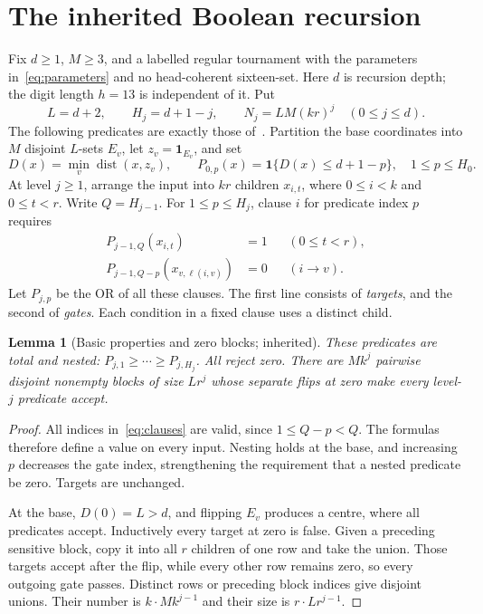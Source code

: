 \documentclass[11pt]{amsart}
\newtheorem{lemma}[theorem]{Lemma}
\theoremstyle{definition}
\theoremstyle{remark}
\newcommand{\dist}{\operatorname{dist}}
\newcommand{\ind}{\mathbf1}
\begin{document}
\section{The inherited Boolean recursion}
Fix $d\ge1$, $M\ge3$, and a labelled regular tournament with the parameters
in~\eqref{eq:parameters} and no head-coherent sixteen-set.
Here $d$ is recursion depth; the digit length $h=13$ is independent of it.
Put
\begin{equation}\label{eq:heights}
 L=d+2,\qquad H_j=d+1-j,\qquad N_j=LM(kr)^j
 \quad(0\le j\le d).
\end{equation}
The following predicates are exactly those of~\cite{OpenAI132}.
Partition the base coordinates into $M$ disjoint $L$-sets $E_v$, let
$z_v=\ind_{E_v}$, and set
\begin{equation}\label{eq:base}
 D(x)=\min_v\dist(x,z_v),\qquad
 P_{0,p}(x)=\ind\{D(x)\le d+1-p\},\quad 1\le p\le H_0.
\end{equation}
At level $j\ge1$, arrange the input into $kr$ children $x_{i,t}$,
where $0\le i<k$ and $0\le t<r$. Write $Q=H_{j-1}$. For
$1\le p\le H_j$, clause $i$ for predicate index $p$ requires
\begin{equation}\label{eq:clauses}
 \begin{aligned}
 P_{j-1,Q}(x_{i,t})&=1 &&(0\le t<r),\\
 P_{j-1,Q-p}(x_{v,\ell(i,v)})&=0 &&(i\to v).
 \end{aligned}
\end{equation}
Let $P_{j,p}$ be the OR of all these clauses. The first line consists
of \emph{targets}, and the second of \emph{gates}. Each condition in a
fixed clause uses a distinct child.

\begin{lemma}[Basic properties and zero blocks; inherited]\label{lem:blocks}
These predicates are total and nested:
$P_{j,1}\ge\cdots\ge P_{j,H_j}$. All reject zero. There are $Mk^j$
pairwise disjoint nonempty blocks of size $Lr^j$ whose separate flips
at zero make every level-$j$ predicate accept.
\end{lemma}
\begin{proof}
All indices in~\eqref{eq:clauses} are valid, since $1\le Q-p<Q$.
The formulas therefore define a value on every input. Nesting holds at
the base, and increasing $p$ decreases the gate index, strengthening the
requirement that a nested predicate be zero. Targets are unchanged.

At the base, $D(0)=L>d$, and flipping $E_v$ produces a centre, where
all predicates accept. Inductively every target at zero is false.
Given a preceding sensitive block, copy it into all $r$ children of
one row and take the union. Those targets accept after the flip, while
every other row remains zero, so every outgoing gate passes. Distinct
rows or preceding block indices give disjoint unions. Their number is
$k\cdot Mk^{j-1}$ and their size is $r\cdot Lr^{j-1}$.
\end{proof}
\end{document}

